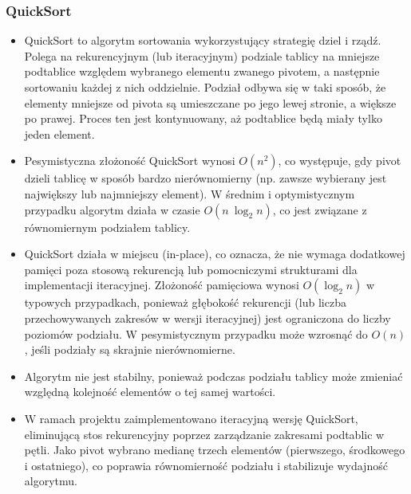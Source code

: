 \documentclass[polish,a4paper]{article}
\begin{document}
\subsubsection{QuickSort}
\begin{itemize}
	\item{QuickSort to algorytm sortowania wykorzystujący strategię dziel i rządź. Polega na rekurencyjnym (lub iteracyjnym) podziale tablicy na mniejsze podtablice względem wybranego elementu zwanego pivotem, a następnie sortowaniu każdej z nich oddzielnie. Podział odbywa się w taki sposób, że elementy mniejsze od pivota są umieszczane po jego lewej stronie, a większe po prawej. Proces ten jest kontynuowany, aż podtablice będą miały tylko jeden element.}
	\item{Pesymistyczna złożoność QuickSort wynosi $O(n^2)$, co występuje, gdy pivot dzieli tablicę w sposób bardzo nierównomierny (np. zawsze wybierany jest największy lub najmniejszy element). W średnim i optymistycznym przypadku algorytm działa w czasie $O(n \ \log_2 n)$, co jest związane z równomiernym podziałem tablicy.}
	\item{QuickSort działa w miejscu (in-place), co oznacza, że nie wymaga dodatkowej pamięci poza stosową rekurencją lub pomocniczymi strukturami dla implementacji iteracyjnej. Złożoność pamięciowa wynosi $O(\log_2 n)$ w typowych przypadkach, ponieważ głębokość rekurencji (lub liczba przechowywanych zakresów w wersji iteracyjnej) jest ograniczona do liczby poziomów podziału. W pesymistycznym przypadku może wzrosnąć do $O(n)$, jeśli podziały są skrajnie nierównomierne.}
	\item{Algorytm nie jest stabilny, ponieważ podczas podziału tablicy może zmieniać względną kolejność elementów o tej samej wartości.}
	\item{W ramach projektu zaimplementowano iteracyjną wersję QuickSort, eliminującą stos rekurencyjny poprzez zarządzanie zakresami podtablic w pętli. Jako pivot wybrano medianę trzech elementów (pierwszego, środkowego i ostatniego), co poprawia równomierność podziału i stabilizuje wydajność algorytmu.}
\end{itemize}
\end{document}
